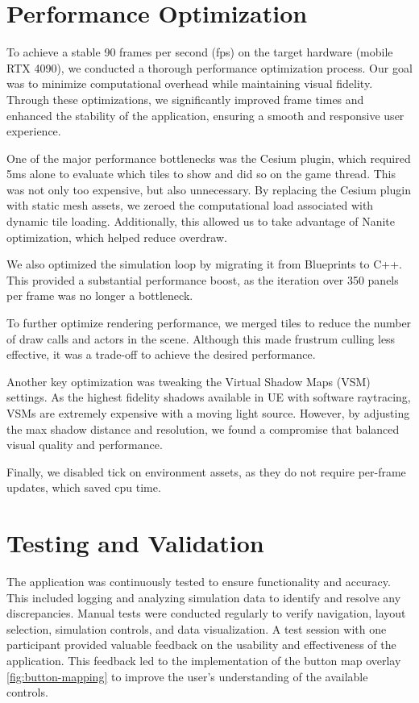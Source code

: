 \documentclass[draft, final]{vutinfth} %
\begin{document}
\section{Performance Optimization}

To achieve a stable 90 frames per second (fps) on the target hardware (mobile RTX 4090), we conducted a thorough performance optimization process. Our goal was to minimize computational overhead while maintaining visual fidelity. Through these optimizations, we significantly improved frame times and enhanced the stability of the application, ensuring a smooth and responsive user experience.

One of the major performance bottlenecks was the Cesium plugin, which required 5ms alone to evaluate which tiles to show and did so on the game thread. This was not only too expensive, but also unnecessary. By replacing the Cesium plugin with static mesh assets, we zeroed the computational load associated with dynamic tile loading. Additionally, this allowed us to take advantage of Nanite optimization, which helped reduce overdraw.

We also optimized the simulation loop by migrating it from Blueprints to C++. This provided a substantial performance boost, as the iteration over 350 panels per frame was no longer a bottleneck.

To further optimize rendering performance, we merged tiles to reduce the number of draw calls and actors in the scene. Although this made frustrum culling less effective, it was a trade-off to achieve the desired performance.

Another key optimization was tweaking the Virtual Shadow Maps (VSM) settings. As the highest fidelity shadows available in UE with software raytracing, VSMs are extremely expensive with a moving light source. However, by adjusting the max shadow distance and resolution, we found a compromise that balanced visual quality and performance.

Finally, we disabled tick on environment assets, as they do not require per-frame updates, which saved cpu time.

\section{Testing and Validation}

The application was continuously tested to ensure functionality and accuracy. This included logging and analyzing simulation data to identify and resolve any discrepancies. Manual tests were conducted regularly to verify navigation, layout selection, simulation controls, and data visualization. A test session with one participant provided valuable feedback on the usability and effectiveness of the application. This feedback led to the implementation of the button map overlay \ref{fig:button-mapping} to improve the user's understanding of the available controls.
\end{document}
